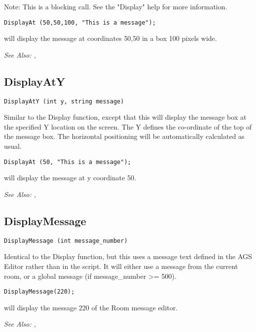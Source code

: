 Note: This is a blocking call. See the "Display" help for more information.

\begin{verbatim}
DisplayAt (50,50,100, "This is a message");
\end{verbatim}
will display the message at coordinates 50,50 in a box 100 pixels wide.

\it{See Also:} , 

\subsection{DisplayAtY}\label{DisplayAtY}%

\begin{verbatim}
DisplayAtY (int y, string message)
\end{verbatim}
Similar to the Display function, except that this will display the message
box at the specified Y location on the screen. The Y defines the co-ordinate
of the top of the message box. The horizontal positioning will be
automatically calculated as usual.

\begin{verbatim}
DisplayAt (50, "This is a message");
\end{verbatim}
will display the message at y coordinate 50.

\it{See Also:} , 

\subsection{DisplayMessage}\label{DisplayMessage}%

\begin{verbatim}
DisplayMessage (int message_number)
\end{verbatim}
Identical to the Display function, but this uses a message text defined in
the AGS Editor rather than in the script. It will either use a message
from the current room, or a global message (if message_number >= 500).

\begin{verbatim}
DisplayMessage(220);
\end{verbatim}
will display the message 220 of the Room message editor.

\it{See Also:} , 


